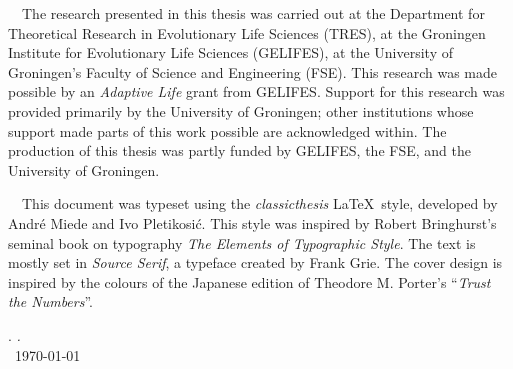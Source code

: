 \thispagestyle{empty}

\hfill

\vfill


\noindent \adftripleflourishright~~The research presented in this thesis was carried out at the Department for Theoretical Research in Evolutionary Life Sciences (TRES), at the Groningen Institute for Evolutionary Life Sciences (GELIFES), at the University of Groningen's Faculty of Science and Engineering (FSE).
This research was made possible by an \emph{Adaptive Life} grant from GELIFES.
Support for this research was provided primarily by the University of Groningen; other institutions whose support made parts of this work possible are acknowledged within.
The production of this thesis was partly funded by GELIFES, the FSE, and the University of Groningen.

\medskip

\noindent \adftripleflourishright~~This document was typeset using the \emph{classicthesis} \LaTeX~style, developed by Andr\'e Miede and Ivo Pletikosić.
This style was inspired by Robert Bringhurst's seminal book on typography \emph{The Elements of Typographic Style}.
The text is mostly set in \emph{Source Serif}, a typeface created by Frank Grie\sshammer.
The cover design is inspired by the colours of the Japanese edition of Theodore M. Porter's ``\emph{Trust the Numbers}''.

\bigskip

\noindent\finalVersionString

\noindent\myName. \textit{\myTitle.}%
\\
\noindent \textcopyright\ \today
